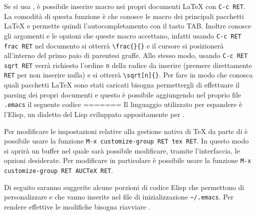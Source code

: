 \documentclass[11pt,a4paper]{article}
\begin{document}
Se si usa \auctex{},
è possibile inserire macro nei propri documenti \LaTeX{}
con \texttt{C-c RET}.  La comodità di questa funzione è che \auctex{}
conosce le macro dei principali pacchetti \LaTeX{}
e permette quindi l'autocompletamento con il tasto TAB.  Inoltre conosce gli
argomenti e le opzioni che queste macro accettano, infatti usando
\texttt{C-c RET frac RET} nel documento si otterrà
\texttt{\textbackslash{}frac\{\}\{\}} e il cursore si posizionerà all'interno
del primo paio di parentesi graffe.  Allo stesso modo, usando
\texttt{C-c RET sqrt RET} verrà richiesto l'ordine \texttt{n} della radice da
inserire (premere direttamente \texttt{RET} per non inserire nulla) e si otterrà
\texttt{\textbackslash{}sqrt[n]\{\}}.  Per fare in modo che \auctex{}
conosca quali pacchetti \LaTeX{}
sono stati caricati bisogna permettergli di effettuare il parsing dei propri
documenti e questo è possibile aggiungendo nel proprio file \texttt{.emacs} il
seguente codice
=======
Il linguaggio utilizzato per espandere \emacs{}
è l'Elisp, un dialetto del Lisp sviluppato appositamente per \emacs{}.

Per modificare le impostazioni relative alla gestione nativa di \TeX{}
da parte di \emacs{}
è possibile usare la funzione \verb!M-x customize-group RET tex RET!.  In questo
modo si aprirà un buffer nel quale sarà possibile modificare, tramite
l'interfaccia, le opzioni desiderate.  Per modificare in particolare \auctex{}
è possibile usare la funzione \verb!M-x customize-group RET AUCTeX RET!.

Di seguito saranno suggerite alcune porzioni di codice Elisp che permettono di
personalizzare \emacs{}
e che vanno inserite nel file di inizializzazione \verb!~/.emacs!.  Per rendere
effettive le modifiche bisogna riavviare \emacs{}.
\end{document}
